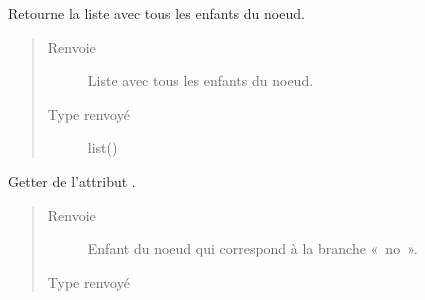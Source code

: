 \documentclass[letterpaper,10pt,french]{sphinxmanual}
\begin{document}
\begin{fulllineitems}
\begin{fulllineitems}
\begin{quote}
\begin{description}
\end{description}\end{quote}

\end{fulllineitems}


\begin{fulllineitems}
\label{\detokenize{index:StrategyTree.Observation.get_list_of_children}}
Retourne la liste avec tous les enfants du noeud.
\begin{quote}\begin{description}
\item[{Renvoie}] \leavevmode
{} \textendash{} Liste avec tous les enfants du noeud.

\item[{Type renvoyé}] \leavevmode
list({\hyperref[\detokenize{index:StrategyTree.NodeST}]{}})

\end{description}\end{quote}

\end{fulllineitems}


\begin{fulllineitems}
\label{\detokenize{index:StrategyTree.Observation.get_no_child}}
Getter de l’attribut .
\begin{quote}\begin{description}
\item[{Renvoie}] \leavevmode
{} \textendash{} Enfant du noeud qui correspond à la branche « no ».

\item[{Type renvoyé}] \leavevmode
{\hyperref[\detokenize{index:StrategyTree.NodeST}]{}}

\end{description}\end{quote}

\end{fulllineitems}


\end{fulllineitems}
\end{document}
